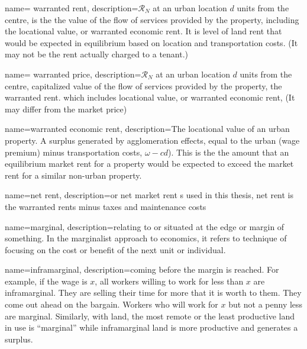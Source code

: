 {
name= warranted rent,
description={$\mathcal{R}_N$ at an  urban location  $d$ units from the centre, is the the value of the flow of services provided by the property, including the locational value, or \gls{warranted economic rent}. It is level of land rent that would be expected in equilibrium based on location and transportation costs.  (It may not be the rent actually charged to a tenant.) }
}

{
name= warranted price,
description={$\mathcal{R}_N$ at an  urban location  $d$ units from the centre, capitalized value of the flow of services provided by the property, the \gls{warranted rent}. 
which  includes locational value, or \gls{warranted economic rent}, (It may differ from the market price) }}

{
name=warranted economic rent,
description={The locational value of an urban property. A surplus generated by \glspl{agglomeration effect}, equal to the urban (wage premium) minus transportation costs, $\omega-{c} d$). This is the the amount that an equilibrium market rent for a property would be expected to exceed the market rent for a similar non-urban property.}
}


{
name=net rent,
description={or net market rent s used in this thesis, net rent is the warranted rents minus taxes and maintenance costs }
}




{
name=marginal,
description={relating to or situated at the edge or margin of something. In the marginalist approach to economics, it  refers to technique of focusing on the cost or benefit of the next unit or individual.}
}

{
name=inframarginal,
description={coming before the margin is reached. For example, if the wage is $x$, all workers willing to work for less than $x$ are inframarginal. They are selling their time for more that it is worth to them. They come out ahead on the bargain. Workers who will work for $x$ but not a penny less are marginal. Similarly, with land, the most remote or the least productive land in use is ``marginal'' while  inframarginal land is more productive and generates a \gls{surplus}.}
}


